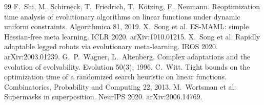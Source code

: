 \documentclass[11pt,a4paper]{article}
\theoremstyle{definition}
\theoremstyle{plain}
\theoremstyle{remark}
\begin{document}
\begin{thebibliography}{99}
 F.~Shi, M.~Schirneck, T.~Friedrich, T.~Kötzing, F.~Neumann. Reoptimization time analysis of evolutionary algorithms on linear functions under dynamic uniform constraints. Algorithmica 81, 2019.
 X.~Song et al. ES-MAML: simple Hessian-free meta learning. ICLR 2020. arXiv:1910.01215.
 X.~Song et al. Rapidly adaptable legged robots via evolutionary meta-learning. IROS 2020. arXiv:2003.01239.
 G.~P.~Wagner, L.~Altenberg. Complex adaptations and the evolution of evolvability. Evolution 50(3), 1996.
 C.~Witt. Tight bounds on the optimization time of a randomized search heuristic on linear functions. Combinatorics, Probability and Computing 22, 2013.
 M.~Wortsman et al. Supermasks in superposition. NeurIPS 2020. arXiv:2006.14769.
\end{thebibliography}
\end{document}
